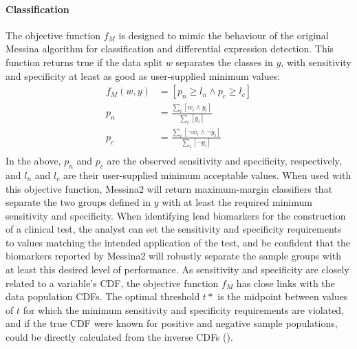 \documentclass[dissertation.tex]{subfiles}
\begin{document}
\paragraph{Classification}
The objective function $f_M$ is designed to mimic the behaviour of the original Messina algorithm for classification and differential expression detection.  This function returns $\mathrm{true}$ if the data split $w$ separates the classes in $y$, with sensitivity and specificity at least as good as user-supplied minimum values:
\begin{align*}
f_M(w, y) &= \left[ p_n \geq l_n \wedge p_c \geq l_c \right] \\
p_n &= \frac{\sum_i{\left[ w_i \wedge y_i \right]}}{\sum_i{\left[ y_i \right]}} \\
p_c &= \frac{\sum_i{\left[ \neg w_i \wedge \neg y_i \right]}}{\sum_i{\left[ \neg y_i \right]}} \\
\end{align*}
In the above, $p_n$ and $p_c$ are the observed sensitivity and specificity, respectively, and $l_n$ and $l_c$ are their user-supplied minimum acceptable values.  When used with this objective function, Messina2 will return maximum-margin classifiers that separate the two groups defined in $y$ with at least the required minimum sensitivity and specificity.  When identifying lead biomarkers for the construction of a clinical test, the analyst can set the sensitivity and specificity requirements to values matching the intended application of the test, and be confident that the biomarkers reported by Messina2 will robustly separate the sample groups with at least this desired level of performance.  As sensitivity and specificity are closely related to a variable's \gls{CDF}, the objective function $f_M$ has close links with the data population \glspl{CDF}.  The optimal threshold $t*$ is the midpoint between values of $t$ for which the minimum sensitivity and specificity requirements are violated, and if the true \gls{CDF} were known for positive and negative sample populations, could be directly calculated from the inverse \glspl{CDF} ().

\begin{figure}[!htbp]
\centering
\def\svgwidth{\linewidth} 

\caption[]{}\label{fig:mess-class-cdf-link}
\end{figure}
\end{document}

